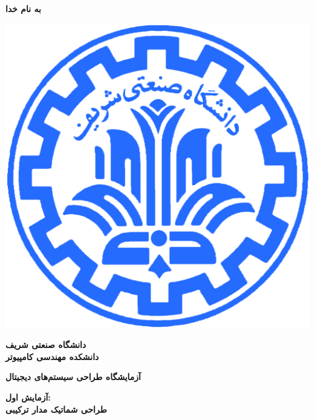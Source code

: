 \documentclass[12pt,onecolumn,a4paper,fleqn]{article}
\begin{document}
	\large
	\begin{titlepage}
		
		\begin{center}
			\begin{huge}
				\textbf{
					به نام خدا\\
				}
			\end{huge}
			
			\vspace*{1.5cm}
			\includegraphics[scale=0.9]{source/sharif_logo.png}\\
			\vspace*{0.5cm}
			\begin{Large}
				\textbf{
					دانشگاه صنعتی شریف\\
					\vspace*{0.25cm}
					دانشکده مهندسی کامپیوتر\\
				}
			\end{Large}
			\vspace*{3cm}
			\begin{huge}
				\textbf{
					آزمایشگاه طراحی سیستم‌های دیجیتال\\
					\vspace*{1.75cm}
				}
			\end{huge}
			
			\begin{Large}
				\textbf{
					آزمایش اول:\\
					طراحی شماتیک مدار ترکیبی\\
				}
			\end{Large}
			

\end{center}
\end{titlepage}
\end{document}
